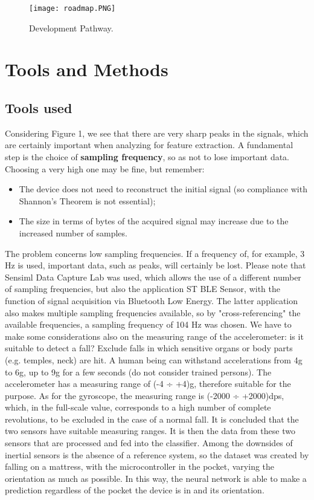 \documentclass[12pt]{article}
\begin{document}
\begin{figure}[!h]
    \centering
    \texttt{[image: roadmap.PNG]}
    \caption{Development Pathway.}
    \label{fig:label}
\end{figure}

\section*{\centering Tools and Methods}
\label{sec:m&s}

\subsection*{Tools used}
Considering Figure 1, we see that there are very sharp peaks in the signals, which are certainly important when analyzing for feature extraction. A fundamental step is the choice of \textbf{sampling frequency}, so as not to lose important data. Choosing a very high one may be fine, but remember:
    \begin{itemize}[noitemsep]
        \item The device does not need to reconstruct the initial signal (so compliance with Shannon's Theorem is not essential);
        \item The size in terms of bytes of the acquired signal may increase due to the increased number of samples.
    \end{itemize}
The problem concerns low sampling frequencies. If a frequency of, for example, 3 Hz is used, important data, such as peaks, will certainly be lost. Please note that Sensiml Data Capture Lab was used, which allows the use of a different number of sampling frequencies, but also the application ST BLE Sensor, with the function of signal acquisition via Bluetooth Low Energy. The latter application also makes multiple sampling frequencies available, so by "cross-referencing" the available frequencies, a sampling frequency of 104 Hz was chosen.
We have to make some considerations also on the measuring range of the accelerometer: is it suitable to detect a fall? Exclude falls in which sensitive organs or body parts (e.g. temples, neck) are hit. A human being can withstand accelerations from 4g to 6g, up to 9g for a few seconds (do not consider trained persons). The accelerometer has a measuring range of (-4 ÷ +4)g, therefore suitable for the purpose. As for the gyroscope, the measuring range is (-2000 ÷ +2000)dps, which, in the full-scale value, corresponds to a high number of complete revolutions, to be excluded in the case of a normal fall.
It is concluded that the two sensors have suitable measuring ranges. It is then the data from these two sensors that are processed and fed into the classifier. Among the downsides of inertial sensors is the absence of a reference system, so the dataset was created by falling on a mattress, with the microcontroller in the pocket, varying the orientation as much as possible. In this way, the neural network is able to make a prediction regardless of the pocket the device is in and its orientation.
\end{document}
